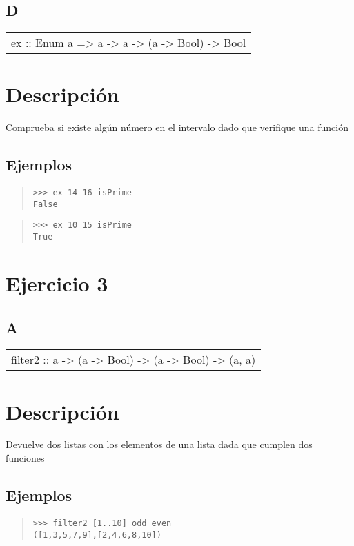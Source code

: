 \subsection{D}
\begin{haddockdesc}
\item[\begin{tabular}{@{}l}
ex :: Enum a => a -> a -> (a -> Bool) -> Bool
\end{tabular}]
{\haddockbegindoc
\section*{Descripción}
Comprueba si existe algún número en el intervalo dado que verifique una función\par
\subsection*{Ejemplos}
\begin{quote}
{\haddockverb\begin{verbatim}
>>> ex 14 16 isPrime
False

\end{verbatim}}
\end{quote}
\begin{quote}
{\haddockverb\begin{verbatim}
>>> ex 10 15 isPrime
True

\end{verbatim}}
\end{quote}}
\end{haddockdesc}
\section{Ejercicio 3}
\subsection{A}
\begin{haddockdesc}
\item[\begin{tabular}{@{}l}
filter2 :: {\char 91}a{\char 93} -> (a -> Bool) -> (a -> Bool) -> ({\char 91}a{\char 93}, {\char 91}a{\char 93})
\end{tabular}]
{\haddockbegindoc
\section*{Descripción}
Devuelve dos listas con los elementos de una lista dada que cumplen dos funciones\par
\subsection*{Ejemplos}
\begin{quote}
{\haddockverb\begin{verbatim}
>>> filter2 [1..10] odd even
([1,3,5,7,9],[2,4,6,8,10])

\end{verbatim}}
\end{quote}}
\end{haddockdesc}

